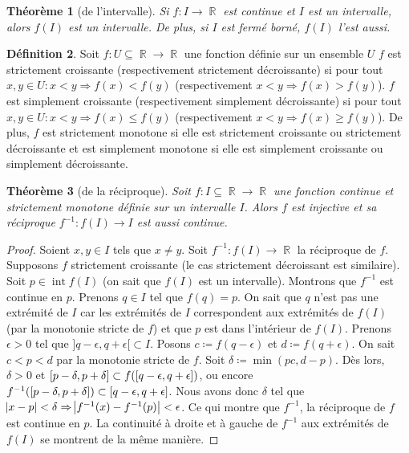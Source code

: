 \documentclass{article}
\DeclareMathOperator{\intr}{int}
\DeclareMathOperator{\R}{\mathbb R}
\newtheorem{thm}{Théorème}[section]
\theoremstyle{definition}
\newtheorem{déf}[thm]{Définition}
\theoremstyle{remark}
\begin{document}
		\begin{thm}[de l'intervalle] Si $f : I \to \R$ est continue et $I$ est un intervalle, alors $f(I)$ est un intervalle. De plus, si $I$ est fermé borné,
		$f(I)$ l'est aussi. \end{thm}

		\begin{déf} Soit $f : U \subseteq \R \to \R$ une fonction définie sur un ensemble $U$ $f$ est strictement croissante (respectivement strictement
		décroissante) si pour tout $x, y \in U : x < y \Rightarrow f(x) < f(y)$ (respectivement $x < y \Rightarrow f(x) > f(y)$). $f$ est simplement croissante
		(respectivement simplement décroissante) si pour tout $x, y \in U : x < y \Rightarrow f(x) \leq f(y)$ (respectivement $x < y \Rightarrow f(x) \geq f(y)$).
		De plus, $f$ est strictement monotone si elle est strictement croissante ou strictement décroissante et est simplement monotone si elle est simplement
		croissante ou simplement décroissante. \end{déf}

		\begin{thm}[de la réciproque] Soit $f : I \subseteq \R \to \R$ une fonction continue et strictement monotone définie sur un intervalle $I$. Alors
		$f$ est injective et sa réciproque $f^{-1} : f(I) \to I$ est aussi continue. \end{thm}

		\begin{proof} Soient $x, y \in I$ tels que $x \neq y$. Soit $f^{-1} : f(I) \to \R$ la réciproque de $f$. Supposons $f$ strictement croissante
		(le cas strictement décroissant est similaire). Soit $p \in \intr f(I)$ (on sait que $f(I)$ est un intervalle). Montrons que $f^{-1}$ est continue en
		$p$. Prenons $q \in I$ tel que $f(q) = p$. On sait que $q$ n'est pas une extrémité de $I$ car les extrémités de $I$ correspondent aux extrémités de
		$f(I)$ (par la monotonie stricte de $f$) et que $p$ est dans l'intérieur de $f(I)$. Prenons $\epsilon > 0$ tel que $]q-\epsilon, q+\epsilon[ \subset I$.
		Posons $c \coloneqq f(q-\epsilon)$ et $d \coloneqq f(q+\epsilon)$. On sait $c < p < d$ par la monotonie stricte de $f$. Soit
		$\delta \coloneqq \min(pc, d-p)$. Dès lors, $\delta > 0$ et $\interval {p-\delta}{p+\delta} \subset f(\interval {q-\epsilon}{q+\epsilon})$, ou encore
		$f^{-1}(\interval {p-\delta}{p+\delta}) \subset \interval {q-\epsilon}{q+\epsilon}$. Nous avons donc $\delta$ tel que
		$\abs{x-p} < \delta \Rightarrow \abs{f^{-1}(x)-f^{-1}(p)} < \epsilon$. Ce qui montre que $f^{-1}$, la réciproque de $f$ est continue en $p$. La continuité
		à droite et à gauche de $f^{-1}$ aux extrémités de $f(I)$ se montrent de la même manière. \end{proof}
\end{document}
